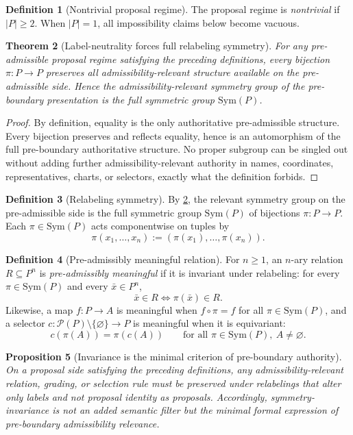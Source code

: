 \documentclass[11pt]{article}
\theoremstyle{plain}
\newtheorem{theorem}{Theorem}[section]
\newtheorem{proposition}[theorem]{Proposition}
\theoremstyle{definition}
\newtheorem{definition}[theorem]{Definition}
\begin{document}
\begin{definition}[Nontrivial proposal regime]
The proposal regime is \emph{nontrivial} if $|P|\ge 2$. When $|P|=1$, all impossibility claims below become vacuous.
\end{definition}

\begin{theorem}[Label-neutrality forces full relabeling symmetry]
\label{thm:B-full-symmetry}
For any pre-admissible proposal regime satisfying the preceding definitions, every bijection $\pi:P\to P$ preserves all admissibility-relevant structure available on the pre-admissible side. Hence the admissibility-relevant symmetry group of the pre-boundary presentation is the full symmetric group $\mathrm{Sym}(P)$.
\end{theorem}

\begin{proof}
By definition, equality is the only authoritative pre-admissible structure. Every bijection preserves and reflects equality, hence is an automorphism of the full pre-boundary authoritative structure. No proper subgroup can be singled out without adding further admissibility-relevant authority in names, coordinates, representatives, charts, or selectors, exactly what the definition forbids.
\end{proof}

\begin{definition}[Relabeling symmetry]
By \cref{thm:B-full-symmetry}, the relevant symmetry group on the pre-admissible side is the full symmetric group $\mathrm{Sym}(P)$ of bijections $\pi:P\to P$. Each $\pi\in\mathrm{Sym}(P)$ acts componentwise on tuples by
\[
\pi(x_1,\dots,x_n):=(\pi(x_1),\dots,\pi(x_n)).
\]
\end{definition}

\begin{definition}[Pre-admissibly meaningful relation]
For $n\ge 1$, an $n$-ary relation $R\subseteq P^n$ is \emph{pre-admissibly meaningful} if it is invariant under relabeling: for every $\pi\in\mathrm{Sym}(P)$ and every $\bar x\in P^n$,
\[
\bar x\in R \Longleftrightarrow \pi(\bar x)\in R.
\]
Likewise, a map $f:P\to A$ is meaningful when $f\circ \pi=f$ for all $\pi\in\mathrm{Sym}(P)$, and a selector $c:\mathcal P(P)\setminus\{\varnothing\}\to P$ is meaningful when it is equivariant:
\[
c(\pi(A))=\pi(c(A)) \qquad \text{for all }\pi\in\mathrm{Sym}(P),\ A\neq\varnothing.
\]
\end{definition}

\begin{proposition}[Invariance is the minimal criterion of pre-boundary authority]
\label{prop:B-invariance-minimal}
On a proposal side satisfying the preceding definitions, any admissibility-relevant relation, grading, or selection rule must be preserved under relabelings that alter only labels and not proposal identity as proposals. Accordingly, symmetry-invariance is not an added semantic filter but the minimal formal expression of pre-boundary admissibility relevance.
\end{proposition}
\end{document}
